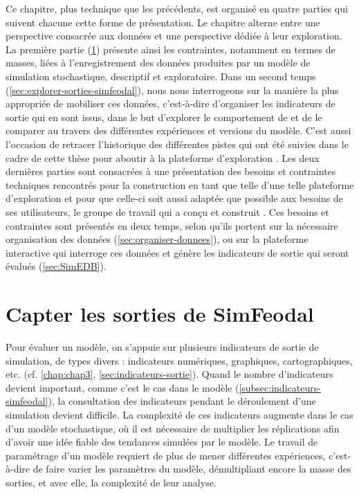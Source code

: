 Ce chapitre, plus technique que les précédents, est organisé en quatre parties qui suivent chacune cette forme de présentation.
Le chapitre alterne entre une perspective consacrée aux données et une perspective dédiée à leur exploration.
La première partie (\cref{sec:sorties-simfeodal}) présente ainsi les contraintes, notamment en termes de masses, liées à l'enregistrement des données produites par un modèle de simulation stochastique, descriptif et exploratoire.
Dans un second temps (\cref{sec:explorer-sorties-simfeodal}), nous nous interrogeons sur la manière la plus appropriée de mobiliser ces données, c'est-à-dire d'organiser les indicateurs de sortie qui en sont issus, dans le but d'explorer le comportement de \simfeodal{} et de le comparer au travers des différentes expériences et versions du modèle.
C'est aussi l'occasion de retracer l'historique des différentes pistes qui ont été suivies dans le cadre de cette thèse pour aboutir à la plateforme d'exploration \simedb{}.
Les deux dernières parties sont consacrées à une présentation des besoins et contraintes techniques rencontrés pour la construction en tant que telle d'une telle plateforme d'exploration et pour que celle-ci soit aussi adaptée que possible aux besoins de ses utilisateurs, le groupe de travail qui a conçu et construit \simfeodal{}.
Ces besoins et contraintes sont présentés en deux temps, selon qu'ils portent sur la nécessaire organisation des données (\cref{sec:organiser-donnees}), ou sur la plateforme interactive qui interroge ces données et génère les indicateurs de sortie qui seront évalués (\cref{sec:SimEDB}).

\section[Capter les sorties de SimFeodal]{{Capter les sorties de SimFeodal}%
	}\label{sec:sorties-simfeodal}

Pour évaluer un modèle, on s'appuie sur plusieurs indicateurs de sortie de simulation, de types divers : indicateurs numériques, graphiques, cartographiques, etc. (cf. \cref{chap:chap3}, \cref{sec:indicateurs-sortie}).
Quand le nombre d'indicateurs devient important, comme c'est le cas dans le modèle \simfeodal{} (\cref{subsec:indicateurs-simfeodal}), la consultation des indicateurs pendant le déroulement d'une simulation devient difficile.
La complexité de ces indicateurs augmente dans le cas d'un modèle stochastique, où il est nécessaire de multiplier les réplications afin d'avoir une idée fiable des tendances simulées par le modèle.
Le travail de paramétrage d'un modèle requiert de plus de mener différentes expériences, c'est-à-dire de faire varier les paramètres du modèle, démultipliant encore la masse des sorties, et avec elle, la complexité de leur analyse.

